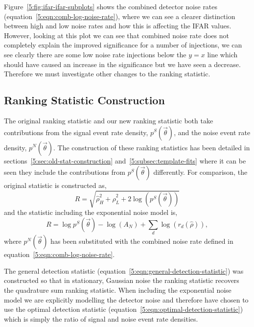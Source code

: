 Figure~\ref{5:fig:ifar-ifar-subplots} shows the combined detector noise rates (equation~\ref{5:eqn:comb-log-noise-rate}), where we can see a clearer distinction between high and low noise rates and how this is affecting the IFAR values. However, looking at this plot we can see that combined noise rate does not completely explain the improved significance for a number of injections, we can see clearly there are some low noise rate injections below the $y=x$ line which should have caused an increase in the significance but we have seen a decrease. Therefore we must investigate other changes to the ranking statistic.

\subsection{\label{5:sec:comparing-statistic-construction}Ranking Statistic Construction}

The original ranking statistic and our new ranking statistic both take contributions from the signal event rate density, $p^{S}(\Vec{\theta})$, and the noise event rate density, $p^{N}(\Vec{\theta})$. The construction of these ranking statistics has been detailed in sections~\ref{5:sec:old-stat-construction} and~\ref{5:subsec:template-fits} where it can be seen they include the contributions from $p^{S}(\Vec{\theta})$ differently. For comparison, the original statistic is constructed as,
%
\begin{equation}
    R = \sqrt{\hat{\rho}^{2}_{H} + \hat{\rho}^{2}_{L} + 2\log\left(p^{S}(\Vec{\theta})\right)}
    \label{5:eqn:original-statistic-repeat}
\end{equation}
%
and the statistic including the exponential noise model is,
%
\begin{equation}
    R = \log p^{S}(\Vec{\theta}) - \log\left(A_{N}\right) + \sum_{d} \log\left(r_{d}(\hat{\rho})\right),
    \label{5:eqn:new-statistic}
\end{equation}
%
where $p^{N}(\Vec{\theta})$ has been substituted with the combined noise rate defined in equation~\ref{5:eqn:comb-log-noise-rate}.

The general detection statistic (equation~\ref{5:eqn:general-detection-statistic}) was constructed so that in stationary, Gaussian noise the ranking statistic recovers the quadrature sum ranking statistic. When including the exponential noise model we are explicitly modelling the detector noise and therefore have chosen to use the optimal detection statistic (equation~\ref{5:eqn:optimal-detection-statistic}) which is simply the ratio of signal and noise event rate densities.

